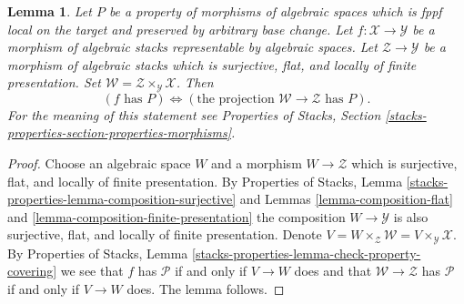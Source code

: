 \documentclass[10pt,a4paper]{amsart}
\theoremstyle{plain}
\newtheorem{lemma}[subsection]{Lemma}
\theoremstyle{definition}
\theoremstyle{remark}
\numberwithin{equation}{subsection}
\begin{document}
\begin{lemma}
\label{lemma-check-property-after-fppf-base-change}
Let $P$ be a property of morphisms of algebraic spaces which is
fppf local on the target and preserved by arbitrary base change.
Let $f : \mathcal{X} \to \mathcal{Y}$ be a morphism of algebraic stacks
representable by algebraic spaces.
Let $\mathcal{Z} \to \mathcal{Y}$ be a morphism of algebraic stacks which
is surjective, flat, and locally of finite presentation.
Set $\mathcal{W} = \mathcal{Z} \times_\mathcal{Y} \mathcal{X}$. Then
$$
(f\text{ has }P) \Leftrightarrow
(\text{the projection }\mathcal{W} \to \mathcal{Z}\text{ has }P).
$$
For the meaning of this statement see
Properties of Stacks, Section
\ref{stacks-properties-section-properties-morphisms}.
\end{lemma}

\begin{proof}
Choose an algebraic space $W$ and a morphism
$W \to \mathcal{Z}$ which is surjective, flat, and locally of finite
presentation. By
Properties of Stacks, Lemma
\ref{stacks-properties-lemma-composition-surjective}
and Lemmas \ref{lemma-composition-flat} and
\ref{lemma-composition-finite-presentation}
the composition $W \to \mathcal{Y}$ is also surjective, flat, and
locally of finite presentation. Denote
$V = W \times_\mathcal{Z} \mathcal{W} = V \times_\mathcal{Y} \mathcal{X}$.
By Properties of Stacks, Lemma
\ref{stacks-properties-lemma-check-property-covering}
we see that $f$ has $\mathcal{P}$ if and only if $V \to W$ does
and that $\mathcal{W} \to \mathcal{Z}$ has $\mathcal{P}$ if and only
if $V \to W$ does. The lemma follows.
\end{proof}
\end{document}
